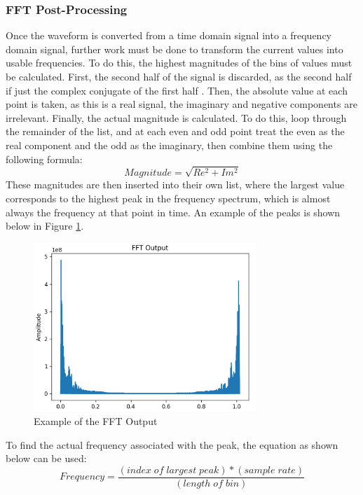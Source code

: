 \documentclass[UTF8, 12pt]{article}
\begin{document}
\subsubsection{FFT Post-Processing}
    Once the waveform is converted from a time domain signal into a frequency domain signal, further work must be done to transform the current values into usable frequencies. To do this, the highest magnitudes of the bins of values must be calculated. First, the second half of the signal is discarded, as the second half if just the complex conjugate of the first half \cite{fft_wiki}. Then, the absolute value at each point is taken, as this is a real signal, the imaginary and negative components are irrelevant. Finally, the actual magnitude is calculated. To do this, loop through the remainder of the list, and at each even and odd point treat the even as the real component and the odd as the imaginary, then combine them using the following formula:
    \begin{equation}
        Magnitude = \sqrt{Re^2 + Im^2}
    \end{equation}
    These magnitudes are then inserted into their own list, where the largest value corresponds to the highest peak in the frequency spectrum, which is almost always the frequency at that point in time. An example of the peaks is shown below in Figure \ref{peaks}.
    \begin{figure}[h]
        \centering
        \includegraphics[width=0.75\textwidth]{fft_peaks.png}
        \caption{Example of the FFT Output}
        \label{peaks}
    \end{figure}
    To find the actual frequency associated with the peak, the equation as shown below can be used:
    \begin{equation}
        Frequency = \frac{(index\;of\;largest\;peak) * (sample\;rate)}{(length\;of\;bin)}  
    \end{equation}
    
\end{document}

